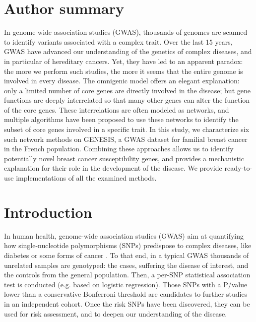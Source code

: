 \documentclass[10pt,letterpaper]{article}
\begin{document}
\section*{Author summary}
In genome-wide association studies (GWAS), thousands of genomes are scanned to identify variants associated with a complex trait. Over the last 15 years, GWAS have advanced our understanding of the genetics of complex diseases, and in particular of hereditary cancers. Yet, they have led to an apparent paradox: the more we perform such studies, the more it seems that the entire genome is involved in every disease. The omnigenic model offers an elegant explanation: only a limited number of core genes are directly involved in the disease; but gene functions are deeply interrelated so that many other genes can alter the function of the core genes. These interrelations are often modeled as networks, and multiple algorithms have been proposed to use these networks to identify the subset of core genes involved in a specific trait. In this study, we characterize six such network methods on GENESIS, a GWAS dataset for familial breast cancer in the French population. Combining these approaches allows us to identify potentially novel breast cancer susceptibility genes, and provides a mechanistic explanation for their role in the development of the disease. We provide ready-to-use implementations of all the examined methods.
\linenumbers

\section{Introduction}

In human health, genome-wide association studies (GWAS) aim at quantifying how single-nucleotide polymorphisms (SNPs) predispose to complex diseases, like diabetes or some forms of cancer \cite{bush_chapter_2012}. To that end, in a typical GWAS thousands of unrelated samples are genotyped: the cases, suffering the disease of interest, and the controls from the general population. Then, a per-SNP statistical association test is conducted (e.g. based on logistic regression). Those SNPs with a P\=/value lower than a conservative Bonferroni threshold are candidates to further studies in an independent cohort. Once the risk SNPs have been discovered, they can be used for risk assessment, and to deepen our understanding of the disease.
\end{document}
